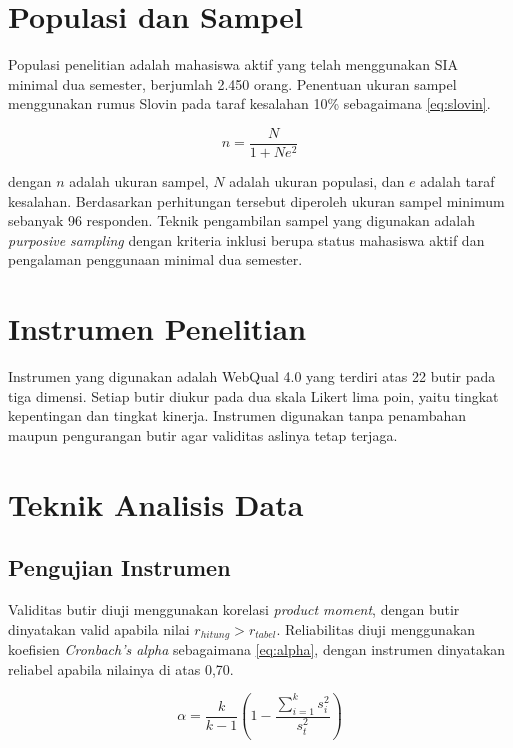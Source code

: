 \section{Populasi dan Sampel}
Populasi penelitian adalah mahasiswa aktif yang telah menggunakan SIA minimal
dua semester, berjumlah 2.450 orang. Penentuan ukuran sampel menggunakan rumus
Slovin pada taraf kesalahan 10\% sebagaimana \cref{eq:slovin}.

\begin{equation}
    \label{eq:slovin}
    n = \frac{N}{1 + N e^{2}}
\end{equation}

\noindent dengan $n$ adalah ukuran sampel, $N$ adalah ukuran populasi, dan $e$
adalah taraf kesalahan. Berdasarkan perhitungan tersebut diperoleh ukuran
sampel minimum sebanyak 96 responden. Teknik pengambilan sampel yang digunakan
adalah \textit{purposive sampling} dengan kriteria inklusi berupa status
mahasiswa aktif dan pengalaman penggunaan minimal dua semester.

\section{Instrumen Penelitian}
Instrumen yang digunakan adalah WebQual 4.0 yang terdiri atas 22 butir pada tiga
dimensi. Setiap butir diukur pada dua skala Likert lima poin, yaitu tingkat
kepentingan dan tingkat kinerja. Instrumen digunakan tanpa penambahan maupun
pengurangan butir agar validitas aslinya tetap terjaga.

\section{Teknik Analisis Data}

\subsection{Pengujian Instrumen}
Validitas butir diuji menggunakan korelasi \textit{product moment}, dengan butir
dinyatakan valid apabila nilai $r_{hitung} > r_{tabel}$. Reliabilitas diuji
menggunakan koefisien \textit{Cronbach's alpha} sebagaimana \cref{eq:alpha},
dengan instrumen dinyatakan reliabel apabila nilainya di atas 0,70.

\begin{equation}
    \label{eq:alpha}
    \alpha = \frac{k}{k-1}\left(1 - \frac{\sum_{i=1}^{k} s_{i}^{2}}{s_{t}^{2}}\right)
\end{equation}

